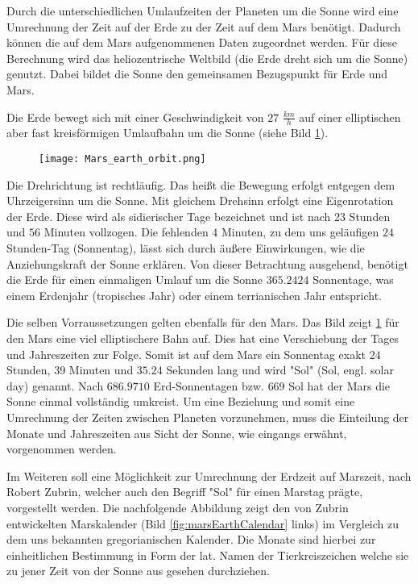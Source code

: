 Durch die unterschiedlichen Umlaufzeiten der Planeten um die Sonne wird eine
Umrechnung der Zeit auf der Erde zu der Zeit auf dem Mars ben{\"o}tigt.
Dadurch k{\"o}nnen die auf dem Mars aufgenommenen Daten zugeordnet werden.
F{\"u}r diese Berechnung wird das heliozentrische Weltbild (die Erde dreht sich
um die Sonne) genutzt.
Dabei bildet die Sonne den gemeinsamen Bezugspunkt f{\"u}r Erde und Mars.

Die Erde bewegt sich mit einer Geschwindigkeit von $27$ $\frac{km}{h}$ auf einer
elliptischen aber fast kreisf{\"o}rmigen Umlaufbahn um die Sonne (siehe Bild
\ref{fig:marsEarthOrbit}).

\begin{figure}[H]
	\centering
	\texttt{[image: Mars\_earth\_orbit.png]}
	\label{fig:marsEarthOrbit}
\end{figure}

Die Drehrichtung ist rechtl{\"a}ufig. Das hei{\ss}t die Bewegung erfolgt
entgegen dem Uhrzeigersinn um die Sonne. Mit gleichem Drehsinn erfolgt eine Eigenrotation
der Erde. Diese wird als sidierischer Tage bezeichnet und ist nach $23$ Stunden
und $56$ Minuten vollzogen. Die fehlenden $4$ Minuten, zu dem uns gel{\"a}ufigen
$24$ Stunden-Tag (Sonnentag), l{\"a}sst sich durch {\"a}u{\ss}ere Einwirkungen,
wie die Anziehungskraft der Sonne erkl{\"a}ren. Von dieser Betrachtung ausgehend, ben{\"o}tigt
die Erde f{\"u}r einen einmaligen Umlauf um die Sonne $365.2424$ Sonnentage, was
einem Erdenjahr (tropisches Jahr) oder einem terrianischen Jahr entspricht. 

Die selben Vorraussetzungen gelten ebenfalls f{\"u}r den Mars. Das Bild zeigt
\ref{fig:marsEarthOrbit} f{\"u}r den Mars eine viel elliptischere Bahn auf. Dies hat
eine Verschiebung der Tages und Jahreszeiten zur Folge. Somit ist auf dem Mars
ein Sonnentag exakt $24$ Stunden, $39$ Minuten und $35.24$ Sekunden lang und
wird "Sol" (Sol, engl. solar day) genannt. Nach $686.9710$ Erd-Sonnentagen bzw.
$669$ Sol hat der Mars die Sonne einmal vollst{\"a}ndig umkreist. Um eine Beziehung
und somit eine Umrechnung der Zeiten zwischen Planeten vorzunehmen, muss die
Einteilung der Monate und Jahreszeiten aus Sicht der Sonne, wie eingangs
erw{\"a}hnt, vorgenommen werden.

Im Weiteren soll eine M{\"o}glichkeit zur Umrechnung der Erdzeit auf Marszeit, nach
Robert Zubrin,  welcher auch den Begriff "Sol" f{\"u}r einen
Marstag pr{\"a}gte, vorgestellt werden. Die nachfolgende Abbildung zeigt den von Zubrin entwickelten
Marskalender (Bild \ref{fig:marsEarthCalendar} links) im Vergleich zu dem uns
bekannten gregorianischen Kalender. Die Monate sind hierbei zur einheitlichen
Bestimmung in Form der lat. Namen der Tierkreiszeichen welche sie zu jener Zeit
von der Sonne aus gesehen durchziehen.

